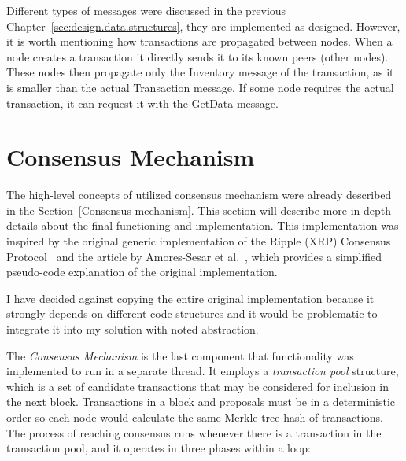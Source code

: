 Different types of messages were discussed in the previous Chapter~\ref{sec:design.data.structures}, they are implemented as designed. However, it is worth mentioning how transactions are propagated between nodes. When a node creates a transaction it directly sends it to its known peers (other nodes). These nodes then propagate only the Inventory message of the transaction, as it is smaller than the actual Transaction message. If some node requires the actual transaction, it can request it with the GetData message.


\section{Consensus Mechanism}

The high-level concepts of utilized consensus mechanism were already described in the Section~\ref{Consensus mechanism}. This section will describe more in-depth details about the final functioning and implementation. This implementation was inspired by the original generic implementation of the Ripple (XRP) Consensus Protocol~\cite{xrp.consensus.mechanism} and the article by Amores-Sesar et al.~\cite{xrp.consensus.analysis}, which provides a simplified pseudo-code explanation of the original implementation.

I have decided against copying the entire original implementation because it strongly depends on different code structures and it would be problematic to integrate it into my solution with noted abstraction. 

The \emph{Consensus Mechanism} is the last component that functionality was implemented to run in a separate thread. It employs a \emph{transaction pool} structure, which is a set of candidate transactions that may be considered for inclusion in the next block. Transactions in a block and proposals must be in a deterministic order so each node would calculate the same Merkle tree hash of transactions. The process of reaching consensus runs whenever there is a transaction in the transaction pool, and it operates in three phases within a loop:

